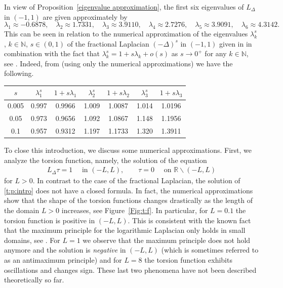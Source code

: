 \documentclass[11 pt]{article}
\numberwithin{equation}{section}
\def\N{\mathbb{N}}
\def\R{\mathbb{R}}
\begin{document}
In view of Proposition~\ref{eigenvalue approximation}, the first six eigenvalues of $L_{\Delta}$ in $(-1,1)$ are given approximately by
\begin{equation*}
\lambda_1\approx -0.6878, \quad \lambda_2\approx 1.7331,\quad \lambda_3\approx 3.9110,\quad \lambda_4\approx 2.7276, \quad \lambda_5\approx 3.9091,\quad \lambda_6\approx 4.3142.
\end{equation*}
This can be seen in relation to the numerical approximation of the eigenvalues $\lambda_{k}^s$, $k\in\N$, $s\in(0,1)$ of the fractional Laplacian $(-\Delta)^s$ in $(-1,1)$ given in \cite{K12} in combination with the fact that  $\lambda_k^s=1+s\lambda_k+o(s)$ as $s\to 0^+$ for any $k\in\N$, see \cite{FJW22}. Indeed, from \cite[Table 1]{K12} (using only the numerical approximations) we have the following.
\begin{center}
\begin{tabular}{c|cc|cc|cc}
$s$ & $\lambda_1^s$ &$1+s\lambda_1$  & $\lambda_2^s$ &$1+s\lambda_2$ & $\lambda_3^s$ &$1+s\lambda_3$\\
\hline
0.005 & 0.997 & 0.9966 & 1.009 & 1.0087 & 1.014 & 1.0196\\
0.05  & 0.973 & 0.9656 & 1.092 & 1.0867 & 1.148 & 1.1956\\
0.1   & 0.957 & 0.9312 & 1.197 & 1.1733 & 1.320 & 1.3911
\end{tabular}
\end{center}

To close this introduction, we discuss some numerical approximations.  First, we analyze the torsion function, namely, the solution of the equation
\begin{align}\label{t:p:intro}
 L_\Delta \tau = 1\quad \text{ in }(-L,L),\qquad \tau=0\quad \text{ on }\R\backslash (-L,L)
\end{align}
for $L>0$.  In contrast to the case of the fractional Laplacian, the solution of \eqref{t:p:intro} does not have a closed formula. In fact, the numerical approximations show that the shape of the torsion functions changes drastically as the length of the domain $L>0$ increases, see Figure~\ref{Fig:t:f}. In particular, for $L=0.1$ the torsion function is positive in $(-L,L)$.  This is consistent with the known fact that the maximum principle for the logarithmic Laplacian only holds in small domains, see \cite[Corollary 1.9]{CW19}. For $L=1$ we observe that the maximum principle does not hold anymore and the solution is \emph{negative} in $(-L,L)$ (which is sometimes referred to as an antimaximum principle) and for $L=8$ the torsion function exhibits oscillations and changes sign. These last two phenomena have not been described theoretically so far.
\end{document}
